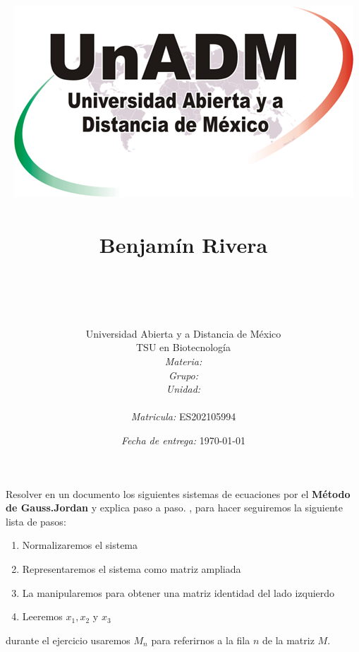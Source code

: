 \documentclass[11pt]{article}
\title{
	\includegraphics{../../../assets/logo-unadm} \\
	\ \\ Benjam\'in Rivera \\
	\bf{\titulo}\\\ \\}
\author{
	Universidad Abierta y a Distancia de México \\
	TSU en Biotecnolog\'ia \\
	\textit{Materia:} \materia \\
	\textit{Grupo:} \grupo \\
	\textit{Unidad:} \unidad \\
	\\
	\textit{Matricula:} ES202105994 }
\date{\textit{Fecha de entrega:} \today}
\begin{document}
\maketitle\newpage

	\par Resolver en un documento los siguientes sistemas de ecuaciones por el \textbf{Método de Gauss.Jordan} y explica paso a paso. , para hacer seguiremos la siguiente lista de pasos:
	\begin{enumerate}
		\item Normalizaremos el sistema
		\item Representaremos el sistema como matriz ampliada
		\item La manipularemos para obtener una matriz identidad del lado izquierdo 
		\item Leeremos $x_1, x_2 \text{ y } x_3$
	\end{enumerate}
	
	durante el ejercicio usaremos $M_n$ para referirnos a la fila $n$ de la matriz $M$.
\end{document}
